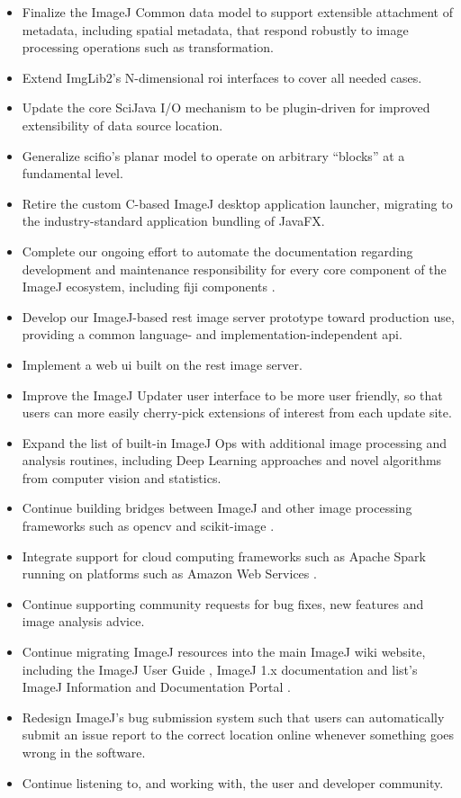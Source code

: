 \documentclass{bmcart}
\begin{document}
\begin{itemize}
  \item Finalize the ImageJ Common data model to support extensible attachment
    of metadata, including spatial metadata, that respond robustly to image
    processing operations such as transformation.
  \item Extend ImgLib2's N-dimensional \acrshort{roi} interfaces to cover all
    needed cases.
  \item Update the core SciJava I/O mechanism to be plugin-driven for improved
    extensibility of data source location.
  \item Generalize \acrshort{scifio}'s planar model to operate on arbitrary
    ``blocks'' at a fundamental level.
  \item Retire the custom C-based ImageJ desktop application launcher,
    migrating to the industry-standard application bundling of JavaFX.
  \item Complete our ongoing effort to automate the documentation regarding
    development and maintenance responsibility for every core component of the
    ImageJ ecosystem, including \acrshort{fiji} components \cite{imagej_team}.
  \item Develop our ImageJ-based \acrshort{rest} image server prototype toward
    production use, providing a common language- and implementation-independent
    \acrshort{api}.
  \item Implement a web \acrshort{ui} built on the \acrshort{rest} image
    server.
  \item Improve the ImageJ Updater user interface to be more user friendly, so
    that users can more easily cherry-pick extensions of interest from each
    update site.
  \item Expand the list of built-in ImageJ Ops with additional image processing
    and analysis routines, including Deep Learning approaches
    \cite{deep_learning} and novel algorithms from computer vision and
    statistics.
  \item Continue building bridges between ImageJ and other image processing
    frameworks such as \acrshort{opencv} \cite{opencv} and scikit-image
    \cite{scikit_image}.
  \item Integrate support for cloud computing frameworks such as Apache Spark
    \cite{apache_spark} running on platforms such as Amazon Web Services
    \cite{aws}.
  \item Continue supporting community requests for bug fixes, new features and
    image analysis advice.
  \item Continue migrating ImageJ resources into the main ImageJ wiki website,
    including the ImageJ User Guide \cite{imagej_user_guide}, ImageJ 1.x
    documentation \cite{imagej1_docs} and \acrshort{list}'s ImageJ Information
    and Documentation Portal \cite{imagej_docu}.
  \item Redesign ImageJ's bug submission system such that users can
    automatically submit an issue report to the correct location online
    whenever something goes wrong in the software.
\item Continue listening to, and working with, the user and developer
  community.
\end{itemize}
\end{document}
